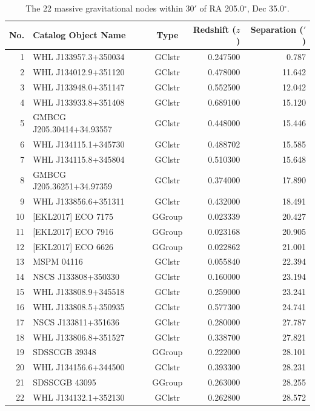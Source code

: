 \documentclass[aps,prd,twocolumn,nofootinbib,superscriptaddress,10pt]{revtex4-2}
\begin{document}
\begin{table}[t]
\centering
\caption{The 22 massive gravitational nodes within 30$'$ of RA 205.0$^\circ$, Dec 35.0$^\circ$.}
\label{tab:nodes}
\begin{tabular}{rlcrr}
\toprule
\textbf{No.} & \textbf{Catalog Object Name} & \textbf{Type} & \textbf{Redshift ($z$)} & \textbf{Separation ($'$)} \\
\midrule
1 & WHL J133957.3+350034 & GClstr & 0.247500 & 0.787 \\
2 & WHL J134012.9+351120 & GClstr & 0.478000 & 11.642 \\
3 & WHL J133948.0+351147 & GClstr & 0.552500 & 12.042 \\
4 & WHL J133933.8+351408 & GClstr & 0.689100 & 15.120 \\
5 & GMBCG J205.30414+34.93557 & GClstr & 0.448000 & 15.446 \\
6 & WHL J134115.1+345730 & GClstr & 0.488702 & 15.585 \\
7 & WHL J134115.8+345804 & GClstr & 0.510300 & 15.648 \\
8 & GMBCG J205.36251+34.97359 & GClstr & 0.374000 & 17.890 \\
9 & WHL J133856.6+351311 & GClstr & 0.432000 & 18.491 \\
10 & [EKL2017] ECO 7175 & GGroup & 0.023339 & 20.427 \\
11 & [EKL2017] ECO 7916 & GGroup & 0.023168 & 20.905 \\
12 & [EKL2017] ECO 6626 & GGroup & 0.022862 & 21.001 \\
13 & MSPM 04116 & GClstr & 0.055840 & 22.394 \\
14 & NSCS J133808+350330 & GClstr & 0.160000 & 23.194 \\
15 & WHL J133808.9+345518 & GClstr & 0.259000 & 23.241 \\
16 & WHL J133808.5+350935 & GClstr & 0.577300 & 24.741 \\
17 & NSCS J133811+351636 & GClstr & 0.280000 & 27.787 \\
18 & WHL J133806.8+351527 & GClstr & 0.338700 & 27.821 \\
19 & SDSSCGB 39348 & GGroup & 0.222000 & 28.101 \\
20 & WHL J134156.6+344500 & GClstr & 0.393300 & 28.231 \\
21 & SDSSCGB 43095 & GGroup & 0.263000 & 28.255 \\
22 & WHL J134132.1+352130 & GClstr & 0.262800 & 28.572 \\
\bottomrule
\end{tabular}
\end{table}
\end{document}

